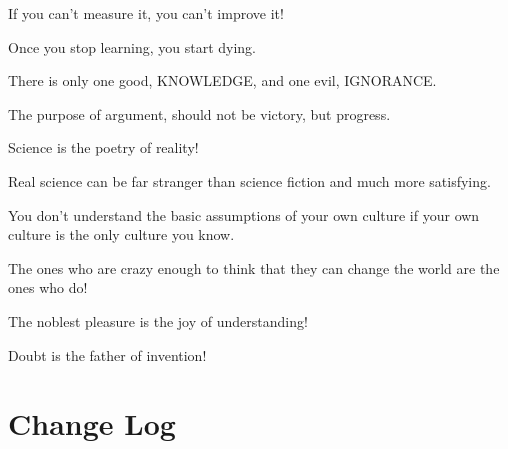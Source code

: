 \documentclass[12pt,a4paper,twoside,openright]{report}
\theoremstyle{definition}
\theoremstyle{itexmp}
\numberwithin{equation}{section}
\begin{document}
 	\begin{fquote}If you can't measure it, you can't improve it!
 	\end{fquote}
 	
 	\begin{fquote}Once you stop learning, you start dying.
 	\end{fquote}
 	
 	\begin{fquote}[Socrates]There is only one good, KNOWLEDGE, and one evil, IGNORANCE.
 	\end{fquote}
 	
 	\begin{fquote}[?]The purpose of argument, should not be victory, but progress.
 	\end{fquote}
 	
 	\begin{fquote}Science is the poetry of reality!
 	\end{fquote}
 	
 	\begin{fquote}Real science can be far stranger than science fiction and much more satisfying.
 	\end{fquote}
 	
 	\begin{fquote} You don't understand the basic assumptions of your own culture if your own culture is the only culture you know.
 	\end{fquote}
 	
 	\begin{fquote}The ones who are crazy enough to think that they can change the world are the ones who do!
 	\end{fquote}
 	
 	\begin{fquote}The noblest pleasure is the joy of understanding!
 	\end{fquote}
 	
 	\begin{fquote}Doubt is the father of invention!
 	\end{fquote}

\chapter{Change Log}
\end{document}
